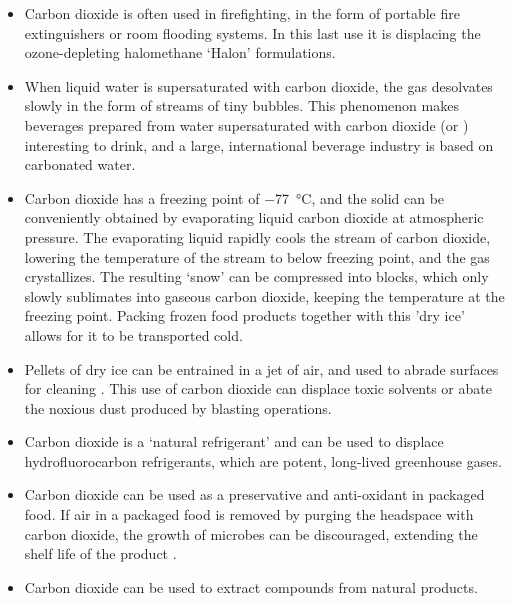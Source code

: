 \begin{itemize}
  
  \item Carbon dioxide is often used in firefighting, in the form of portable
  fire extinguishers or room flooding systems. In this last use it is displacing
  the ozone-depleting halomethane `Halon' formulations.
  
  \item When liquid water is supersaturated with carbon dioxide, the gas
  desolvates slowly in the form of streams of tiny bubbles. This phenomenon
  makes beverages prepared from water supersaturated with carbon dioxide (or
  ) interesting to drink, and a large, international
  beverage industry is based on carbonated water.
   
   \item Carbon dioxide has a freezing point of \SI{-77}{\celsius}, and the
   solid can be conveniently obtained by evaporating liquid carbon dioxide at
   atmospheric pressure. The evaporating liquid rapidly cools the stream of
   carbon dioxide, lowering the temperature of the stream to below freezing
   point, and the gas crystallizes. The resulting `snow' can be compressed into
   blocks, which only slowly sublimates into gaseous carbon dioxide, keeping the
   temperature at the freezing point. Packing frozen food products together with
   this 'dry ice' allows for it to be transported cold.
   
   \item Pellets of dry ice can be entrained in a jet of air, and used to abrade
   surfaces for cleaning \autocite{Spur1999}. This use of carbon dioxide can
   displace toxic solvents or abate the noxious dust produced by blasting operations.
   
   \item Carbon dioxide is a `natural refrigerant' \autocite{Pearson2005} and
   can be used to displace hydrofluorocarbon refrigerants, which are potent,
   long-lived greenhouse gases.
   
   \item Carbon dioxide can be used as a preservative and anti-oxidant in
   packaged food. If air in a packaged food is removed by purging the headspace
   with carbon dioxide, the growth of microbes can be discouraged, extending the
   shelf life of the product \autocite{Jacobsen2002}.
	   
	\item Carbon dioxide can be used to extract compounds from natural products. 
	
\end{itemize}

